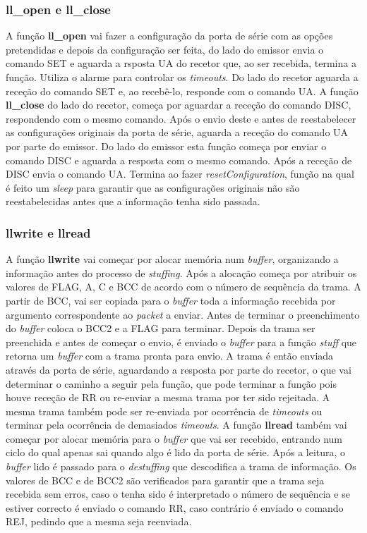 \documentclass[11pt]{article}
\begin{document}
 \subsubsection{ll\_open e ll\_close} 

  A função \textbf{ll\_open} vai fazer a configuração da porta de série com as opções pretendidas e depois da configuração ser feita, do lado do emissor envia o comando SET e aguarda a rsposta UA do recetor que, ao ser recebida, termina a função. Utiliza o alarme para controlar os \textit{timeouts}. Do lado do recetor aguarda a receção do comando SET e, ao recebê-lo, responde com o comando UA. A função \textbf{ll\_close} do lado do recetor, começa por aguardar a receção do comando DISC, respondendo com o mesmo comando. Após o envio deste e antes de reestabelecer as configurações originais da porta de série, aguarda a receção do comando UA por parte do emissor. Do lado do emissor esta função começa por enviar o comando DISC e aguarda a resposta com o mesmo comando. Após a receção de DISC envia o comando UA. Termina ao fazer \textit{resetConfiguration}, função na qual é feito um \textit{sleep} para garantir que as configurações originais não são reestabelecidas antes que a informação tenha sido passada.
   
 \subsubsection{llwrite e llread}
    
    A função \textbf{llwrite} vai começar por alocar memória num \textit{buffer}, organizando a informação antes do processo de \textit{stuffing}. Após a alocação começa por atribuir os valores de FLAG, A, C e BCC de acordo com o número de sequência da trama. A partir de BCC, vai ser copiada para o \textit{buffer} toda a informação recebida por argumento correspondente ao \textit{packet} a enviar. Antes de terminar o preenchimento do \textit{buffer} coloca o BCC2 e a FLAG para terminar. Depois da trama ser preenchida e antes de começar o envio, é enviado o \textit{buffer} para a função \textit{stuff} que retorna um \textit{buffer} com a trama pronta para envio. A trama é então enviada através da porta de série, aguardando a resposta por parte do recetor, o que vai determinar o caminho a seguir pela função, que pode terminar a função pois houve receção de RR ou re-enviar a mesma trama por ter sido rejeitada. A mesma trama também pode ser re-enviada por ocorrência de \textit{timeouts} ou terminar pela ocorrência de demasiados \textit{timeouts}. A função \textbf{llread} também vai começar por alocar memória para o \textit{buffer} que vai ser recebido, entrando num ciclo do qual apenas sai quando algo é lido da porta de série. Após a leitura, o \textit{buffer} lido é passado para o \textit{destuffing} que descodifica a trama de informação. Os valores de BCC e de BCC2 são verificados para garantir que a trama seja recebida sem erros, caso o tenha sido é interpretado o número de sequência e se estiver correcto é enviado o comando RR, caso contrário é enviado o comando REJ, pedindo que a mesma seja reenviada.
\end{document}
